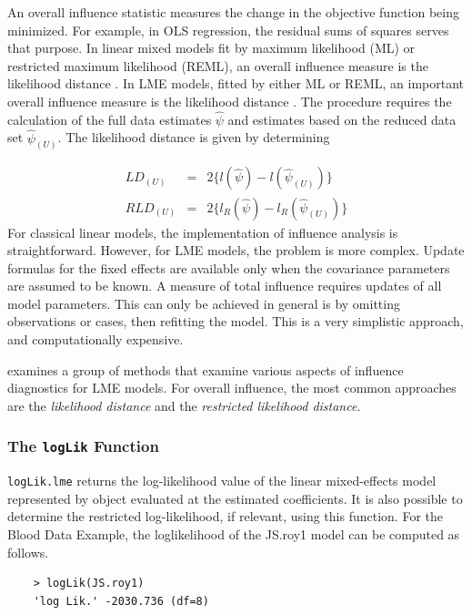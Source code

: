 \documentclass[12pt, a4paper]{report}
\theoremstyle{plain}
\theoremstyle{definition}
\theoremstyle{remark}
\begin{document}
An overall influence statistic measures the change in the objective function being minimized. For example, in
OLS regression, the residual sums of squares serves that purpose. In linear mixed models fit by
 maximum likelihood (ML) or  restricted maximum likelihood (REML), an overall influence measure is the  likelihood distance \citep{cook}. In LME models, fitted by either ML or REML, an important overall
influence measure is the likelihood distance \citep{cook82}. The  procedure requires the calculation of the full data estimates
$\hat{\psi}$ and estimates based on the reduced data set  $\hat{\psi}_{(U)}$. The likelihood distance is given by
determining


\begin{eqnarray}
LD_{(U)} &=& 2\{l(\hat{\psi}) - l( \hat{\psi}_{(U)}) \}\\
RLD_{(U)} &=& 2\{l_{R}(\hat{\psi}) - l_{R}(\hat{\psi}_{(U)})\}
\end{eqnarray}
For classical linear models, the implementation of influence analysis is straightforward.
However, for LME models, the problem is more complex. Update formulas for the fixed effects are available only when the covariance parameters are assumed to be known. A measure of total influence requires updates of all model parameters. This can only be achieved in general is by omitting observations or cases, then refitting the model. This is a very simplistic approach, and computationally expensive.

\citet{west} examines a group of methods that examine various aspects of influence diagnostics for LME models.
For overall influence, the most common approaches are the \textit{likelihood distance} and the \textit{restricted likelihood distance}.

\subsubsection{The \texttt{logLik} Function}
\texttt{logLik.lme} returns the log-likelihood value of the linear mixed-effects model represented by object evaluated at the estimated coefficients. It is also possible to determine the restricted log-likelihood, if relevant, using this function. For the Blood Data Example,  the loglikelihood of the JS.roy1 model can be computed as follows.
\begin{framed}
	\begin{verbatim}
	> logLik(JS.roy1)
	'log Lik.' -2030.736 (df=8)
	\end{verbatim}
\end{framed}
	
\end{document}
